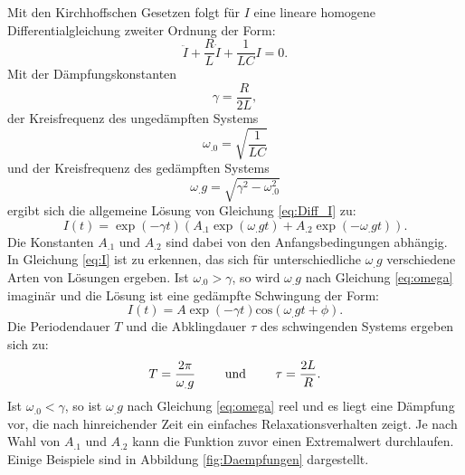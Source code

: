 \noindent Mit den Kirchhoffschen Gesetzen folgt für $I$ eine lineare homogene Differentialgleichung zweiter Ordnung der Form:
\begin{equation}
\ddot{I} + \frac{R}{L} \dot{I} + \frac{1}{LC}I = 0\text{.} \label{eq:Diff_I}
\end{equation}
Mit der Dämpfungskonstanten
\begin{equation}
\gamma=\frac{R}{2L},\label{eq:gamma}
\end{equation}
der Kreisfrequenz des ungedämpften Systems
\[
\omega_.0 = \sqrt{\frac{1}{LC}}
\]
und der Kreisfrequenz des gedämpften Systems
\begin{equation}
\omega_.g=\sqrt{\gamma^2-\omega_.0^2}\label{eq:omega}
\end{equation}
ergibt sich die allgemeine Lösung von Gleichung \eqref{eq:Diff_I} zu:
\begin{equation}
I(t) = \exp(-\gamma t)\left(A_.1\exp(\omega_.g t)+A_.2\exp(-\omega_.g t)\right)\text{.} \label{eq:I}
\end{equation}
Die Konstanten $A_.1$ und $A_.2$ sind dabei von den Anfangsbedingungen abhängig.
In Gleichung \eqref{eq:I} ist zu erkennen, das sich für unterschiedliche $\omega_.g$ verschiedene Arten von Lösungen ergeben.\newline
Ist $\omega_.0>\gamma$, so wird $\omega_.g$ nach Gleichung \eqref{eq:omega} imaginär und die Lösung ist eine gedämpfte Schwingung der Form:
\begin{equation}
I(t) = A \exp(-\gamma t) \mathrm{cos}(\omega_.g t + \phi)\text{.} \label{eq:I2}
\end{equation}
Die Periodendauer $T$ und die Abklingdauer $\tau$ des schwingenden Systems ergeben sich zu:
\begin{equation}
T = \frac{2\pi}{\omega_.g} \text{\hspace{2em} und \hspace{2em}} \tau = \frac{2L}{R}\text{.}\label{eq:tau}
\end{equation}
Ist $\omega_.0<\gamma$, so ist $\omega_.g$ nach Gleichung \eqref{eq:omega} reel und es liegt eine Dämpfung vor, die nach hinreichender Zeit ein einfaches Relaxationsverhalten zeigt. Je nach Wahl von $A_.1$ und $A_.2$ kann die Funktion zuvor einen Extremalwert durchlaufen. Einige Beispiele sind in Abbildung \ref{fig:Daempfungen} dargestellt.

